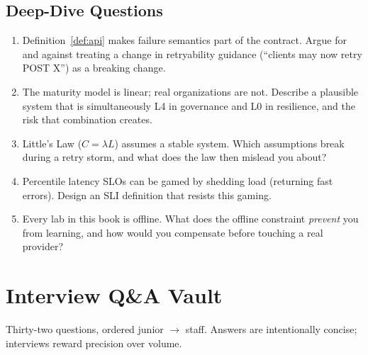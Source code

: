 \subsection{Deep-Dive Questions}

\begin{enumerate}[label=\textbf{D0.\arabic*.}]
  \item Definition~\ref{def:api} makes failure semantics part of the
    contract. Argue for and against treating a change in retryability
    guidance (``clients may now retry POST X'') as a breaking change.
  \item The maturity model is linear; real organizations are not. Describe a
    plausible system that is simultaneously L4 in governance and L0 in
    resilience, and the risk that combination creates.
  \item Little's Law ($C = \lambda L$) assumes a stable system. Which
    assumptions break during a retry storm, and what does the law then
    mislead you about?
  \item Percentile latency SLOs can be gamed by shedding load (returning
    fast errors). Design an SLI definition that resists this gaming.
  \item Every lab in this book is offline. What does the offline constraint
    \emph{prevent} you from learning, and how would you compensate before
    touching a real provider?
\end{enumerate}

\section{Interview Q\&A Vault}
\label{sec:ch0-qa}

Thirty-two questions, ordered junior $\to$ staff. Answers are intentionally
concise; interviews reward precision over volume.

